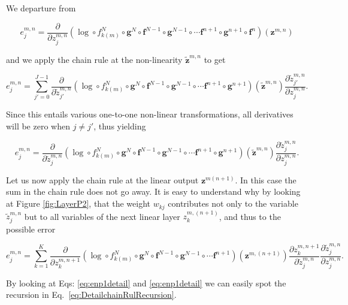 \noindent We departure from

\begin{equation}
e^{m,n}_j = \frac{\partial}{\partial z^{m,n}_{j}} (\log \circ f_{k(m)}^N \circ \mathbf{g}^N \circ \mathbf{f}^{N-1} \circ \mathbf{g}^{N-1} \circ \cdots \mathbf{f}^{n+1} \circ \mathbf{g}^{n+1} \circ \mathbf{f}^{n})(\mathbf{z}^{m,n}) 
\end{equation}

\noindent and we apply the chain rule at the non-linearity $\tilde{\mathbf{z}}^{m,n}$ to get

\begin{equation}
e^{m,n}_j =  \sum_{j'=0}^{J-1}\frac{\partial}{\partial \tilde{z}^{m,n}_{j'}} (\log \circ f_{k(m)}^N \circ \mathbf{g}^N \circ \mathbf{f}^{N-1} \circ \mathbf{g}^{N-1} \circ \cdots \mathbf{f}^{n+1} \circ \mathbf{g}^{n+1})(\tilde{\mathbf{z}}^{m,n})\frac{\partial \tilde{z}^{m,n}_{j'}}{\partial z_{j}^{m,n}}.
\end{equation}

Since this entails various one-to-one non-linear transformations, all
derivatives will be zero when $j\neq j'$, thus yielding 

\begin{equation}
e^{m,n}_j =  \frac{\partial}{\partial \tilde{z}^{m,n}_{j}} (\log \circ f_{k(m)}^N \circ \mathbf{g}^N \circ \mathbf{f}^{N-1} \circ \mathbf{g}^{N-1} \circ \cdots \mathbf{f}^{n+1} \circ \mathbf{g}^{n+1})(\tilde{\mathbf{z}}^{m,n})\frac{\partial \tilde{z}^{m,n}_{j}}{\partial z_{j}^{m,n}}.
\end{equation}

Let us now apply the chain rule at the linear output $\mathbf{z}^{m(n+1)}$. In this case the sum in the chain rule does not go away. It is easy to
understand why by looking at Figure \ref{fig:LayerP2}, that the weight $w_{kj}$
contributes not only to the variable $\tilde{z}^{m,n}_j$ but to all variables of the
next linear layer $z^{m,(n+1)}_k$, and thus to the possible error

\begin{equation}
e^{m,n}_j = \sum_{k=1}^K \frac{\partial}{\partial z^{m,n+1}_{k}} (\log \circ f_{k(m)}^N \circ \mathbf{g}^N \circ \mathbf{f}^{N-1} \circ \mathbf{g}^{N-1} \circ \cdots \mathbf{f}^{n+1})(\mathbf{z}^{m,(n+1)})\frac{\partial z^{m,n+1}_k}{\partial \tilde{z}_{j}^{m,n}}\frac{\partial \tilde{z}^{m,n}_{j}}{\partial z_{j}^{m,n}}.
\label{eq:partialfn4}
\end{equation}

\noindent By looking at Eqs: \ref{eq:enp1detail} and \ref{eq:enp1detail} we can easily
spot the recursion in Eq.~\ref{eq:DetailchainRulRecursion}.  


